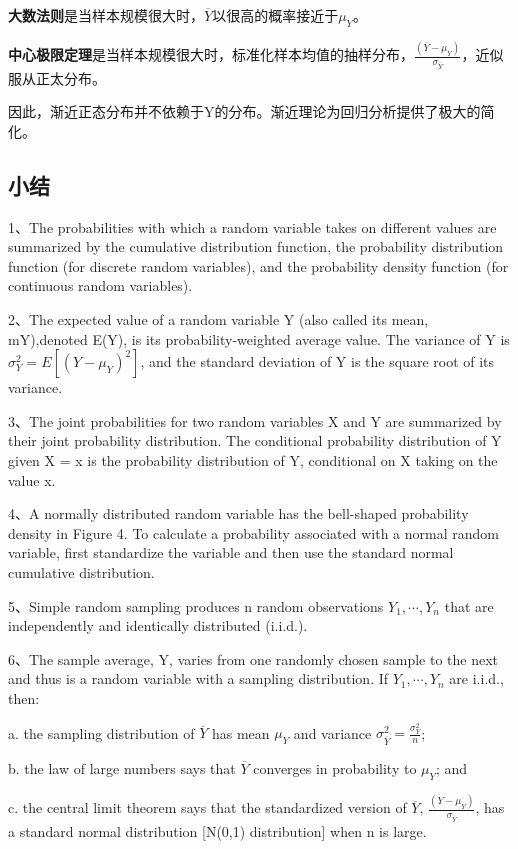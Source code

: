 \documentclass[cn,12pt,math=newtx,citestyle=gb7714-2015,bibstyle=gb7714-2015]{elegantbook}
\begin{document}
	\textbf{大数法则}是当样本规模很大时，$\overline{Y}$以很高的概率接近于$\mu_Y$。
	
	\textbf{中心极限定理}是当样本规模很大时，标准化样本均值的抽样分布，$\frac{(\overline{Y}-\mu_Y)}{\sigma_{\overline{Y}}}$，近似服从正太分布。
	
	因此，渐近正态分布并不依赖于Y的分布。渐近理论为回归分析提供了极大的简化。
	
	\subsection{小结}
	1、The probabilities with which a random variable takes on different values are summarized by the cumulative distribution function, the probability distribution function (for discrete random variables), and the probability density function (for continuous random variables).
	
	2、The expected value of a random variable Y (also called its mean, mY),denoted E(Y), is its probability-weighted average value. The variance of Y
	is $\sigma_Y^2=E[(Y-\mu_Y)^2]$, and the standard deviation of Y is the square root of its variance.
	
	3、The joint probabilities for two random variables X and Y are summarized by their joint probability distribution. The conditional probability distribution of Y given X = x is the probability distribution of Y, conditional on X taking on the value x.
	
	4、A normally distributed random variable has the bell-shaped probability density in Figure 4. To calculate a probability associated with a normal random variable, first standardize the variable and then use the standard normal cumulative distribution.
	
	5、Simple random sampling produces n random observations $Y_1,\cdots,Y_n$ that are independently and identically distributed (i.i.d.).
	
	6、The sample average, Y, varies from one randomly chosen sample to the next
	and thus is a random variable with a sampling distribution. If $Y_1,\cdots,Y_n$ are
	i.i.d., then:
	
	a. the sampling distribution of $\overline{Y}$ has mean $\mu_Y$ and variance $\sigma_{\overline{Y}}^2=\frac{\sigma_{Y}^2}{n}$;
	
	b. the law of large numbers says that $\overline{Y}$ converges in probability to $\mu_Y$; and
	
	c. the central limit theorem says that the standardized version of $\overline{Y}$,
	$\frac{(Y-\mu_Y)}{\sigma_{\overline{Y}}}$, has a standard normal distribution [N(0,1) distribution] when n is large.
	
\end{document}
